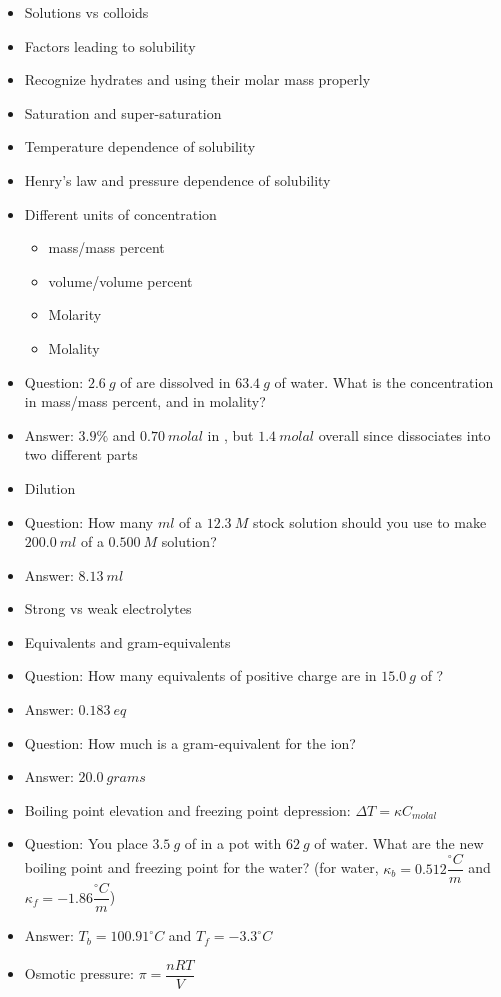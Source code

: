 \documentclass[12pt, letterpaper]{memoir}
\begin{document}
	\begin{itemize}
		\item Solutions vs colloids
		\item Factors leading to solubility
		\item Recognize hydrates and using their molar mass properly
		\item Saturation and super-saturation
		\item Temperature dependence of solubility
		\item Henry's law and pressure dependence of solubility
		\item Different units of concentration
		\begin{itemize}
			\item mass/mass percent
			\item volume/volume percent
			\item Molarity
			\item Molality
		\end{itemize}
		\item Question: $2.6~g$ of  are dissolved in $63.4~g$ of water. What is the concentration in mass/mass percent, and in molality?
		\item Answer: $3.9\%$ and $0.70~molal$ in , but $1.4~molal$ overall since  dissociates into two different parts
		\item Dilution
		\item Question: How many $ml$ of a $12.3~M$ stock solution should you use to make $200.0~ml$ of a $0.500~M$ solution?
		\item Answer: $8.13~ml$
		\item Strong vs weak electrolytes
		\item Equivalents and gram-equivalents
		\item Question: How many equivalents of positive charge are in $15.0~g$ of ?
		\item Answer: $0.183~eq$
		\item Question: How much is a gram-equivalent for the  ion?
		\item Answer: $20.0~grams$
		\item Boiling point elevation and freezing point depression: $\Delta T=\kappa C_{molal}$
		\item Question: You place $3.5~g$ of  in a pot with $62~g$ of water. What are the new boiling point and freezing point for the water? (for water, $\kappa_b = 0.512\dfrac{^\circ C}{m}$ and $\kappa_f = -1.86\dfrac{^\circ C}{m}$)
		\item Answer: $T_b = 100.91 ^\circ C$ and $T_f = -3.3 ^\circ C$
		\item Osmotic pressure: $\pi = \dfrac{nRT}{V}$
	\end{itemize}
\end{document}
